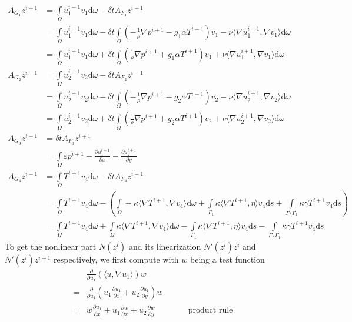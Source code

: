 \documentclass{article}
\begin{document}
\begin{align*}
A_{G_1}z^{i+1} &= \int\limits_\Omega u_1^{i+1} v_1 \text{d}\omega - \delta tA_{F_1}z^{i+1} \\
&= \int\limits_\Omega u_1^{i+1} v_1 \text{d}\omega - \delta t\int\limits_\Omega \left(-\frac{1}{\rho}\nabla p^{i+1}-g_1\alpha T^{i+1}\right)v_1 - \nu\langle \nabla u_1^{i+1},\nabla v_1\rangle \text{d}\omega\\
&= \int\limits_\Omega u_1^{i+1} v_1 \text{d}\omega + \delta t\int\limits_\Omega \left(\frac{1}{\rho}\nabla p^{i+1}+g_1\alpha T^{i+1}\right)v_1 + \nu\langle \nabla u_1^{i+1},\nabla v_1\rangle \text{d}\omega\\
A_{G_2}z^{i+1} &= \int\limits_\Omega u_2^{i+1} v_2 \text{d}\omega - \delta tA_{F_2}z^{i+1} \\
&= \int\limits_\Omega u_2^{i+1} v_2 \text{d}\omega - \delta t\int\limits_\Omega \left(-\frac{1}{\rho}\nabla p^{i+1}-g_2\alpha T^{i+1}\right)v_2 - \nu\langle \nabla u_2^{i+1},\nabla v_2\rangle \text{d}\omega\\
&= \int\limits_\Omega u_2^{i+1} v_2 \text{d}\omega + \delta t\int\limits_\Omega \left(\frac{1}{\rho}\nabla p^{i+1}+g_2\alpha T^{i+1}\right)v_2 + \nu\langle \nabla u_2^{i+1},\nabla v_2\rangle \text{d}\omega\\
A_{G_3}z^{i+1} &= \delta tA_{F_3} z^{i+1} \\
&= \int\limits_\Omega \varepsilon p^{i+1} - \frac{\partial u_1^{i+1}}{\partial x} - \frac{\partial u_2^{i+1}}{\partial y}\\
A_{G_4}z^{i+1} &= \int\limits_\Omega T^{i+1} v_4 \text{d}\omega - \delta tA_{F_4}z^{i+1} \\
&= \int\limits_\Omega T^{i+1} v_4 \text{d}\omega -\left(\int\limits_\Omega -\kappa \langle \nabla T^{i+1},\nabla v_4\rangle \text{d}\omega + \int\limits_{\Gamma_1} \kappa\langle \nabla T^{i+1},\eta\rangle v_4 \text{d}s + \int\limits_{\Gamma \setminus \Gamma_1}\kappa\gamma T^{i+1}v_4\text{d}s\right) \\
&= \int\limits_\Omega T^{i+1} v_4 \text{d}\omega + \int\limits_\Omega \kappa \langle \nabla T^{i+1},\nabla v_4\rangle \text{d}\omega - \int\limits_{\Gamma_1} \kappa\langle \nabla T^{i+1},\eta\rangle v_4 \text{d}s - \int\limits_{\Gamma \setminus \Gamma_1}\kappa\gamma T^{i+1}v_4\text{d}s
\end{align*}
To get the nonlinear part $N(z^i)$ and its linearization $N'(z^i)z^i$ and $N'(z^i)z^{i+1}$ respectively, we first compute with $w$ being a test function
\begin{align*}
&\frac{\partial}{\partial u_1}(\langle u,\nabla u_1\rangle) w \\
=& \frac{\partial}{\partial u_1}(u_1 \frac{\partial u_1}{\partial x} + u_2 \frac{\partial u_1}{\partial y}) w\\
=& w\frac{\partial u_1}{\partial x}+ u_1\frac{\partial w}{\partial x}+ u_2 \frac{\partial w}{\partial y}\qquad \qquad \text{product rule}
\end{align*}
\end{document}
